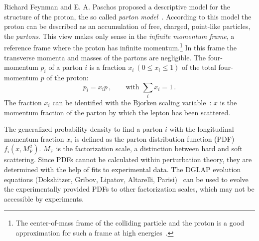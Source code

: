 Richard Feynman and E. A. Paschos proposed a descriptive model for the structure of the proton, the so called
\emph{parton model}~\cite{feyn69,bjo:epscattering}.
According to this model the proton can be described as an accumulation of free, charged, point-like particles, the \emph{partons}.
This view makes only sense in the \emph{infinite momentum frame}, a reference frame where the proton has infinite
momentum.\footnote{The center-of-mass frame of the colliding particle and the proton is a good approximation
for such a frame at high energies~\cite{bjo:epscattering}.}
In this frame the transverse momenta and masses of the partons are negligible.
The four-momentum $p_i$ of a parton $i$ is a fraction $x_i \ (0 \leq x_i \leq 1)$ of the total four-momentum $p$ of the proton:
\begin{equation}
    p_i = x_i p\,, \qquad\text{with } \sum_i x_i = 1\,.
\end{equation}
The fraction $x_i$ can be identified with the Bjorken scaling variable~\cite{bjo:epscattering}: $x$ is the momentum fraction of the parton
by which the lepton has been scattered.

The generalized probability density to find a parton $i$ with the longitudinal momentum fraction $x_i$ is defined as the
parton distribution function (PDF) $f_i(x, M_\text{F}^2)$.
$M_\text{F}$ is the factorization scale, a distinction between hard and soft scattering.
Since PDFs cannot be calculated within perturbation theory, they are determined with the help of fits to experimental data.
The DGLAP evolution equations (Dokshitzer, Gribov, Lipatov, Altarelli, Parisi)~\cite{dglap:d, dglap:gl, dglap:ap}
can be used to evolve the experimentally provided PDFs to other factorization scales, which may not be accessible by experiments.

